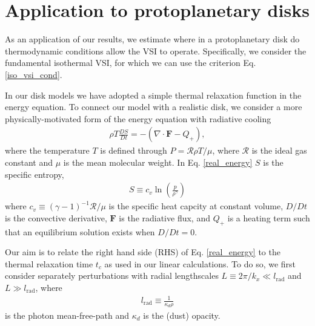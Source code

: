 \section{Application to protoplanetary disks}\label{application} 
As an application of our results, we estimate where in a 
protoplanetary disk do thermodynamic conditions allow the VSI to 
operate. Specifically, we consider the fundamental isothermal VSI, 
for which we can use the criterion Eq. \ref{iso_vsi_cond}.   

In our disk models we have adopted a simple thermal relaxation 
function in the energy equation. To connect our model with a realistic
disk, we consider a more physically-motivated form of the energy
equation with radiative cooling 
\begin{align}\label{real_energy}
\rho T \frac{DS}{Dt} = - \left(\nabla\cdot\bm{F} - Q_+\right), 
\end{align}
where the temperature $T$ is defined through $P=\mathcal{R}\rho
T/\mu$, where $\mathcal{R}$ is the ideal gas constant and $\mu$ is
the mean molecular weight. In Eq. \ref{real_energy} $S$ is the
specific entropy,
\begin{align}
  S \equiv c_v\ln{\left(\frac{p}{\rho^{\gamma}}\right)} 
\end{align}
where $c_v \equiv \left(\gamma-1\right)^{-1}\mathcal{R}/\mu$ is the
specific heat capcity at constant volume, $D/Dt$ is the convective
derivative, $\bm{F}$ is the radiative flux, and $Q_+$ is a heating
term such that an equilibrium solution exists when $D/Dt=0$. 

Our aim is to relate the right hand side (RHS) of Eq. \ref{real_energy} to
the thermal relaxation time $t_c$ as used in our linear
calculations. To do so, we first consider separately perturbations
with radial lengthscales $L\equiv 2\pi/k_x\ll l_\mathrm{rad}$ and 
$L\gg l_\mathrm{rad}$, where      
\begin{align}\label{lrad}
  l_\mathrm{rad} \equiv \frac{1}{\kappa_d\rho} 
\end{align} 
is the photon mean-free-path and $\kappa_d$ is the (dust) opacity. 

